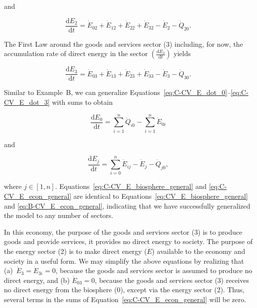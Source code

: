 \noindent and 

\begin{equation} \label{eq:C-CV_E_dot_2}
	\frac{\mathrm{d}E_{2}}{\mathrm{d}t} 	 
	= \dot{E}_{02} 
	+ \dot{E}_{12}
	+ \dot{E}_{22} 
	+ \dot{E}_{32} 
	- \dot{E}_{2} 
	- \dot{Q}_{20}.
\end{equation}

The First Law around the goods and services sector (3) including, 
for now, the accumulation rate of direct energy in the sector 
$\left(\frac{\mathrm{d}E_{3}}{\mathrm{d}t}\right)$ yields

\begin{equation} \label{eq:C-CV_E_dot_3}
	\frac{\mathrm{d}E_{3}}{\mathrm{d}t} 
	= \dot{E}_{03} 
	+ \dot{E}_{13}
	+ \dot{E}_{23} 
	+ \dot{E}_{33} 
	- \dot{E}_3 
	- \dot{Q}_{30}.
\end{equation}

Similar to Example~B, we can generalize 
Equations~\ref{eq:C-CV_E_dot_0}--\ref{eq:C-CV_E_dot_3}
with sums to obtain

\begin{equation} \label{eq:C-CV_E_biosphere_general}
	\frac{\mathrm{d}E_{0}}{\mathrm{d}t} 	 
	= \sum\limits_{i=1}^n \dot{Q}_{i0} - \sum\limits_{i=1}^n \dot{E}_{0i}
\end{equation}

\noindent and

\begin{equation} \label{eq:C-CV_E_econ_general}
	\frac{\mathrm{d}E_{j}}{\mathrm{d}t} 
	= \sum\limits_{i=0}^n\dot{E}_{ij} 
	- \dot{E}_{j}  
	- \dot{Q}_{j0},
\end{equation}

\noindent where $j \in [1, n]$. 
Equations~\ref{eq:C-CV_E_biosphere_general} and 
\ref{eq:C-CV_E_econ_general} are identical to 
Equations~\ref{eq:CV_E_biosphere_general} and 
\ref{eq:B-CV_E_econ_general}, 
indicating that we have successfully generalized 
the model to any number of sectors.

In this economy, the purpose of the goods and services sector (3) 
is to produce goods and provide services, 
it provides no direct energy to society. 
The purpose of the energy sector (2) is to make direct energy ($\dot{E}$) 
available to the economy and society in a useful form.
We may simplify the above equations
by realizing that (a)~$\dot{E}_{3} = \dot{E}_{3i} = 0$, 
because the goods and services sector 
is assumed to produce no direct energy, 
and (b) $\dot{E}_{03} = 0$, 
because the goods and services sector (3) 
receives no direct energy from the biosphere (0), 
except via the energy sector (2).
Thus, several terms in the sums of
Equation~\ref{eq:C-CV_E_econ_general}
will be zero.


